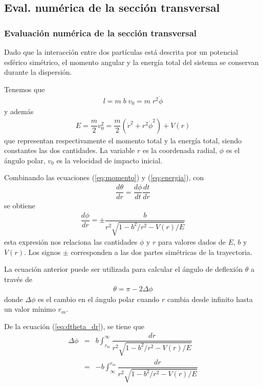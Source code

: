 \subsection{Eval. numérica de la sección transversal}
\begin{frame}
\frametitle{Evaluación numérica de la sección transversal}
Dado que la interacción entre dos partículas está descrita por un potencial esférico simétrico, el momento angular y la energía total del sistema se conservan durante la dispersión.
\end{frame}
\begin{frame}
Tenemos que
\begin{eqnarray}
l = m \; b \; v_{0} = m \; r^{2} \dot{\phi}
\label{eq:momento}
\end{eqnarray}
y además
\begin{eqnarray}
E = \dfrac{m}{2} v_{0}^{2} = \dfrac{m}{2} \left( \dot{r}^{2} + r^{2} \dot{\phi}^{2} \right) + V(r)
\label{eq:energia}
\end{eqnarray}
que representan respectivamente el momento total y la energía total, siendo constantes las dos cantidades. La variable $r$ es la coordenada radial, $\phi$ es el ángulo polar, $v_{0}$ es la velocidad de impacto inicial.
\end{frame}
\begin{frame}
Combinando las ecuaciones (\ref{eq:momento}) y (\ref{eq:energia}), con
\begin{eqnarray}
\dfrac{d \theta}{dr} = \dfrac{d \phi}{dt} \dfrac{dt}{dr}
\end{eqnarray}
se obtiene
\begin{eqnarray}
\dfrac{d \phi}{dr} = \pm \dfrac{b}{r^{2} \sqrt{1-b^{2}/r^{2}-V(r)/E}}
\label{eq:dtheta_dr}
\end{eqnarray}
esta expresión nos relaciona las cantidades $\phi$ y $r$ para valores dados de $E$, $b$ y $V(r)$. Los signos $\pm$ corresponden a las dos partes simétricas de la trayectoria.
\end{frame}
\begin{frame}
La ecuación anterior puede ser utilizada para calcular el ángulo de deflexión $\theta$ a través de
\begin{eqnarray}
\theta = \pi - 2 \Delta \phi
\label{eq:theta}
\end{eqnarray}
donde $\Delta \phi$ es el cambio en el ángulo polar cuando $r$ cambia desde infinito hasta un valor mínimo $r_{m}$. 
\end{frame}
\begin{frame}
De la ecuación (\ref{eq:dtheta_dr}), se tiene que
\begin{eqnarray}
\Delta \phi &=&  b \int_{r_{m}}^{\infty} \dfrac{dr}{r^{2} \sqrt{1 - b^{2}/r^{2}-V(r)/E}} \nonumber \\
&=& - b \int_{\infty}^{r_{m}} \dfrac{dr}{r^{2} \sqrt{1 - b^{2}/r^{2}-V(r)/E}}
\end{eqnarray}
\end{frame}

